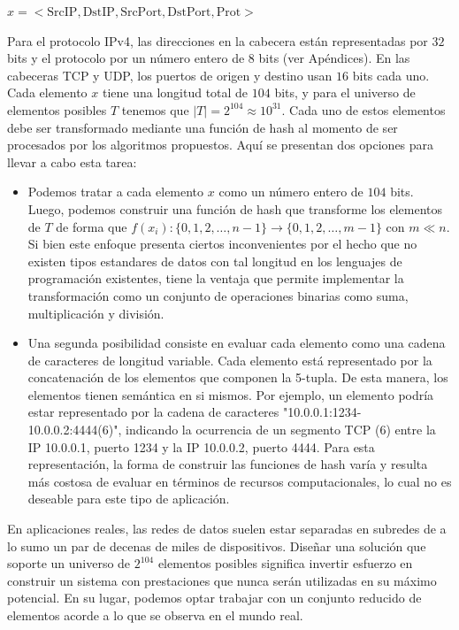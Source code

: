 \documentclass[a4paper,10pt, oneside]{article}
\begin{document}
\begin{center}
	$x = <\text{SrcIP}, \text{DstIP}, \text{SrcPort}, \text{DstPort}, \text{Prot}>$
\end{center}

Para el protocolo IPv4\cite{rfc791}, las direcciones en la cabecera están representadas por $32$ bits y el protocolo por un número entero de $8$ bits (ver Apéndices). En las cabeceras TCP y UDP, los puertos de origen y destino usan $16$ bits cada uno. Cada elemento $x$ tiene una longitud total de $104$ bits, y para el universo de elementos posibles $T$ tenemos que $|T| = 2^{104} \approx 10 ^ {31}$.
Cada uno de estos elementos debe ser transformado mediante una función de hash al momento de ser procesados por los algoritmos propuestos. Aquí se presentan dos opciones para llevar a cabo esta tarea:
\begin{itemize}
	\item Podemos tratar a cada elemento $x$ como un número entero de $104$ bits. Luego, podemos construir una función de hash que transforme los elementos de $T$ de forma que $f(x_i): \{0,1,2, \dots, n-1\} \rightarrow \{0,1,2, \dots, m-1\}$ con $m \ll n$. Si bien este enfoque presenta ciertos inconvenientes por el hecho que no existen tipos estandares de datos con tal longitud en los lenguajes de programación existentes, tiene la ventaja que permite implementar la transformación como un conjunto de operaciones binarias como suma, multiplicación y división.
	\item Una segunda posibilidad consiste en evaluar cada elemento como una cadena de caracteres de longitud variable. Cada elemento está representado por la concatenación de los elementos que componen la 5-tupla. De esta manera, los elementos tienen semántica en si mismos. Por ejemplo, un elemento podría estar representado por la cadena de caracteres "10.0.0.1:1234-10.0.0.2:4444(6)", indicando la ocurrencia de un segmento TCP (6) entre la IP 10.0.0.1, puerto 1234 y la IP 10.0.0.2, puerto 4444. Para esta representación, la forma de construir las funciones de hash varía y resulta más costosa de evaluar en términos de recursos computacionales, lo cual no es deseable para este tipo de aplicación.
\end{itemize}

En aplicaciones reales, las redes de datos suelen estar separadas en subredes de a lo sumo un par de decenas de miles de dispositivos. Diseñar una solución que soporte un universo de $2^{104}$ elementos posibles significa invertir esfuerzo en construir un sistema con prestaciones que nunca serán utilizadas en su máximo potencial. En su lugar, podemos optar trabajar con un conjunto reducido de elementos acorde a lo que se observa en el mundo real.
\end{document}

